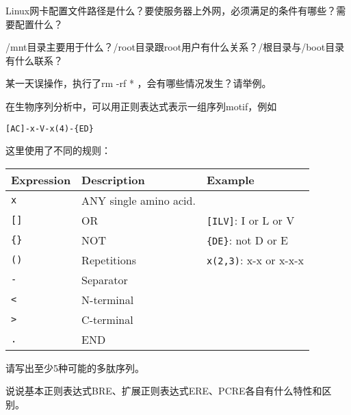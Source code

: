 \documentclass[addpoints,12pt,answers]{exam}
\begin{document}
\begin{CJK*}{UTF8}{gbsn}
\begin{questions}
\question[5]
Linux网卡配置文件路径是什么？要使服务器上外网，必须满足的条件有哪些？需要配置什么？
\begin{solution}
\vspace{2in}
\end{solution}
\vspace{2in}

\question[5]
/mnt目录主要用于什么？/root目录跟root用户有什么关系？/根目录与/boot目录有什么联系？
\begin{solution}
\vspace{2in}
\end{solution}
\vspace{2in}

\question[5]
某一天误操作，执行了rm  -rf  * ，会有哪些情况发生？请举例。
\begin{solution}
\vspace{2in}
\end{solution}
\vspace{2in}

\question[5]
在生物序列分析中，可以用正则表达式表示一组序列motif，例如
\begin{lstlisting}
[AC]-x-V-x(4)-{ED}
\end{lstlisting}
这里使用了不同的规则：
\begin{table}[ht]
\begin{tabular}{lll}
\hline
\textbf{Expression} & \textbf{Description} & \textbf{Example}\\ 
\hline
\texttt{x} & ANY single amino acid. & \\
\texttt{[]} & OR & \texttt{[ILV]}: I or L or V\\
\texttt{\{\}} & NOT & \texttt{\{DE\}}: not D or E\\
\texttt{()} & Repetitions & \texttt{x(2,3)}: x-x or x-x-x\\
\texttt{-}	& Separator & \\
\texttt{<} & N-terminal & \\
\texttt{>} & C-terminal & \\
\texttt{.} & END & \\
\hline
\end{tabular}
\end{table}
请写出至少5种可能的多肽序列。

\begin{solution}
\vspace{2in}
\end{solution}



\question[5]
说说基本正则表达式BRE、扩展正则表达式ERE、PCRE各自有什么特性和区别。
\begin{solution}
\vspace{2in}
\end{solution}


\end{questions}
\end{CJK*}
\end{document}
